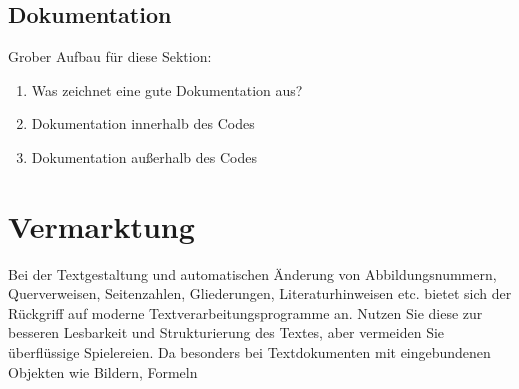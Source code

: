 \subsection{Dokumentation}
Grober Aufbau für diese Sektion:

\begin{enumerate}
  \item Was zeichnet eine gute Dokumentation aus?
  \item Dokumentation innerhalb des Codes
  \item Dokumentation außerhalb des Codes
\end{enumerate}

\section{Vermarktung}
Bei der Textgestaltung und automatischen Änderung von Abbildungsnummern, Querverweisen,
Seitenzahlen, Gliederungen, Literaturhinweisen etc. bietet sich der Rückgriff
auf moderne Textverarbeitungsprogramme an. Nutzen Sie diese zur besseren Lesbarkeit
und Strukturierung des Textes, aber vermeiden Sie überflüssige Spielereien. Da
besonders bei Textdokumenten mit eingebundenen Objekten wie Bildern, Formeln
